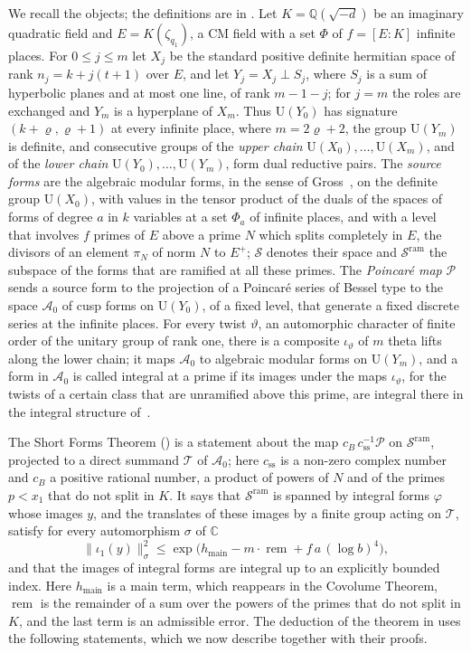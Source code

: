 \documentclass[10pt]{amsart}
\theoremstyle{definition}
\theoremstyle{remark}
\newcommand{\C}{\mathbb C}
\newcommand{\Q}{\mathbb Q}
\providecommand{\auAz}{\mathcal A_0}
\providecommand{\auP}{\mathcal P}
\providecommand{\auPa}{\Phi_a}
\providecommand{\auPl}{\Phi}
\providecommand{\auS}{\mathcal S}
\providecommand{\auSram}{\mathcal S^{\mathrm{ram}}}
\providecommand{\auT}{\mathcal T}
\providecommand{\auU}{\mathrm U}
\providecommand{\aucB}{c_B}
\providecommand{\auhmain}{h_{\mathrm{main}}}
\providecommand{\aurem}{\operatorname{rem}}
\begin{document}
We recall the objects; the definitions are in {\cite[\S\S14.1--14.3]{P46}}. Let
$K=\Q(\sqrt{-d})$ be an imaginary quadratic field and $E=K(\zeta_{q_1})$, a CM field with a set
$\auPl$ of $f=[E:K]$ infinite places. For $0\le j\le m$ let $X_j$ be the standard positive
definite hermitian space of rank $n_j=k+j(t+1)$ over $E$, and let $Y_j=X_j\perp S_j$, where $S_j$
is a sum of hyperbolic planes and at most one line, of rank $m-1-j$; for $j=m$ the roles are
exchanged and $Y_m$ is a hyperplane of $X_m$. Thus $\auU(Y_0)$ has signature $(k+\varrho,
\varrho+1)$ at every infinite place, where $m=2\varrho+2$, the group $\auU(Y_m)$ is definite, and
consecutive groups of the \emph{upper chain} $\auU(X_0),\dots,\auU(X_m)$, and of the \emph{lower
chain} $\auU(Y_0),\dots,\auU(Y_m)$, form dual reductive pairs. The \emph{source forms} are the
algebraic modular forms, in the sense of Gross~\cite{GrossAMF}, on the definite group
$\auU(X_0)$, with values in the tensor product of the duals of the spaces of forms of degree $a$
in $k$ variables at a set $\auPa$ of infinite places, and with a level that involves $f$ primes of
$E$ above a prime $N$ which splits completely in $E$, the divisors of an element $\pi_N$ of norm
$N$ to $E^+$; $\auS$ denotes their space and $\auSram$ the subspace of the forms that are ramified
at all these primes. The \emph{Poincar\'e map} $\auP$
sends a source form to the projection of a Poincar\'e series of Bessel type to the space $\auAz$
of cusp forms on $\auU(Y_0)$, of a fixed level, that generate a fixed discrete series at the
infinite places. For every twist $\vartheta$, an automorphic character of finite order of the unitary group
of rank one, there is a composite $\iota_\vartheta$ of $m$ theta lifts along the lower chain; it
maps $\auAz$ to algebraic modular forms on $\auU(Y_m)$, and a form in $\auAz$ is called integral
at a prime if its images under the maps $\iota_\vartheta$, for the twists of a certain class that
are unramified above this prime, are integral there in the integral structure
of~\cite{GrossAMF}.

The Short Forms Theorem ({\cite[Theorem~14.13]{P46}}) is a statement about the map
$\aucB\,c_{\mathrm{ss}}^{-1}\auP$ on $\auSram$, projected to a direct summand $\auT$ of $\auAz$;
here $c_{\mathrm{ss}}$ is a non-zero complex number and $\aucB$ a positive rational number, a
product of powers of $N$ and of the primes $p<x_1$ that do not split in $K$. It says that
$\auSram$ is spanned by integral forms $\varphi$ whose images $y$, and the translates of these
images by a finite group acting on $\auT$, satisfy for every automorphism $\sigma$ of $\C$
\[
\|\iota_1(y)\|_\sigma^2\le\exp\bigl(\auhmain-m\cdot\aurem+f\,a\,(\log b)^4\bigr),
\]
and that the images of integral forms are integral up to an explicitly bounded index. Here
$\auhmain$ is a main term, which reappears in the Covolume Theorem, $\aurem$ is the remainder of a
sum over the powers of the primes that do not split in $K$, and the last term is an admissible
error. The deduction of the theorem in {\cite[\S14.7]{P46}} uses the following
statements, which we now describe together with their proofs.
\end{document}
